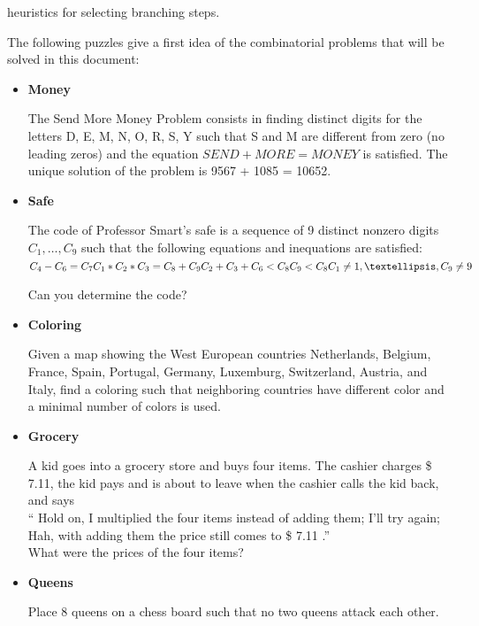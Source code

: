 \documentclass[a4paper]{scrartcl}
\begin{document}
heuristics for selecting branching steps.
\par
The following puzzles give a first idea of the combinatorial 
problems
that will be solved in this document:
\begin{itemize}

\item
{\bf Money}
\par
The Send More Money Problem consists in finding distinct 
digits for the letters 
D, E, M, N, O, R, S, Y such that S and M are different 
from zero (no leading zeros) and 
the equation
    $ SEND + MORE = MONEY $
is satisfied. The unique solution of the problem is 
9567 + 1085 = 10652.

\item
{\bf Safe}
\par
The code of Professor Smart's safe is a sequence of 9 
distinct nonzero digits 
$ C_1,\ldots,C_9 $ such that the following equations 
and inequations are satisfied:\\
     $ C_4 - C_6 = C_7 \\ 
     C_1 * C_2 * C_3 = C_8 + C_9 \\ 
     C_2 + C_3 + C_6 < C_8 \\ 
     C_9 < C_8 \\ 
     C_1 \neq 1,\ldots, C_9 \neq 9 $
\par
Can you determine the code?

\item
{\bf Coloring}
\par
Given a map showing the West European countries Netherlands, 
Belgium, France, Spain, 
Portugal, Germany, Luxemburg, Switzerland, Austria, and Italy, 
find a coloring such 
that neighboring countries have different color and a minimal 
number of colors is used.

\item
\par
{\bf Grocery}
\par
A kid goes into a grocery store and buys four items. The cashier 
charges \$ 7.11, the kid 
pays and is about to leave when the cashier calls the kid back, 
and says \\
`` Hold on, I multiplied the four items instead of adding them; 
I'll try again; 
Hah, with adding them the price still comes to \$ 7.11 .'' \\
What were the prices of the four items?

\item
\par
{\bf Queens}
\par
Place 8 queens on a chess board such that no two queens attack 
each other.
\end{itemize}
\par
\end{document}

